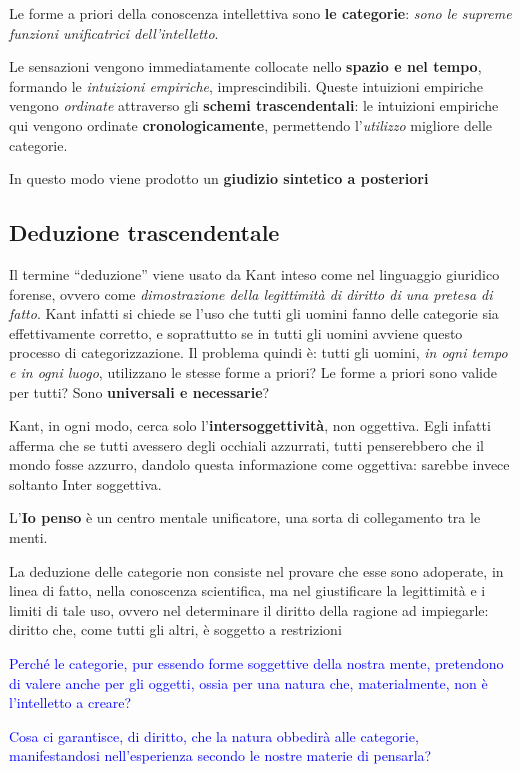 \documentclass[a4paper, twoside, titlepage]{book}
\renewcommand{\emph}[1]{\textcolor{blue}{#1}}
\begin{document}
Le forme a priori della conoscenza intellettiva sono \textbf{le categorie}: \textit{sono le supreme funzioni unificatrici dell’intelletto}.

Le sensazioni vengono immediatamente collocate nello \textbf{spazio e nel tempo}, formando le \textit{intuizioni empiriche}, imprescindibili.
Queste intuizioni empiriche vengono \textit{ordinate} attraverso gli \textbf{schemi trascendentali}: le intuizioni empiriche qui vengono ordinate \textbf{cronologicamente}, permettendo l’\textit{utilizzo} migliore delle categorie.

In questo modo viene prodotto un \textbf{giudizio sintetico a posteriori}

\subsection{Deduzione trascendentale}

Il termine “deduzione” viene usato da Kant inteso come nel linguaggio giuridico forense, ovvero come \textit{dimostrazione della legittimità di diritto di una pretesa di fatto}.
Kant infatti si chiede se l’uso che tutti gli uomini fanno delle categorie sia effettivamente corretto, e soprattutto se in tutti gli uomini avviene questo processo di categorizzazione. 
Il problema quindi è: tutti gli uomini, \textit{in ogni tempo e in ogni luogo}, utilizzano le stesse forme a priori? Le forme a priori sono valide per tutti?
Sono \textbf{universali e necessarie}?

Kant, in ogni modo, cerca solo l’\textbf{intersoggettività}, non oggettiva. Egli infatti afferma che se tutti avessero degli occhiali azzurrati, tutti penserebbero che il mondo fosse azzurro, dandolo questa informazione come oggettiva: sarebbe invece soltanto Inter soggettiva.

L’\textbf{Io penso} è un centro mentale unificatore, una sorta di collegamento tra le menti.

La deduzione delle categorie non consiste nel provare che esse sono adoperate, in linea di fatto, nella conoscenza scientifica, ma nel giustificare la legittimità e i limiti di tale uso, ovvero nel determinare il diritto della ragione ad impiegarle: diritto che, come tutti gli altri, è soggetto a restrizioni

\emph{Perché le categorie, pur essendo forme soggettive della nostra mente, pretendono di valere anche per gli oggetti, ossia per una natura che, materialmente, non è l’intelletto a creare?}

\emph{Cosa ci garantisce, di diritto, che la natura obbedirà alle categorie, manifestandosi nell’esperienza secondo le nostre materie di pensarla?}
\end{document}
